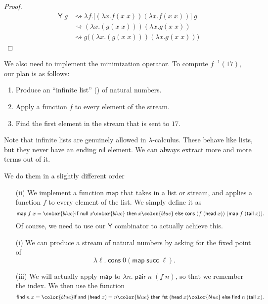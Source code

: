\documentclass[a4paper]{article}
\newcommand\head{\mathsf{head}}
\newcommand\tail{\mathsf{tail}}
\newcommand\pair{\mathsf{pair}}
\renewcommand\succ{\mathsf{succ}}
\newcommand\cif{{\color{blue} \mathsf{if}\;}}
\newcommand\cthen{{\color{blue}\;\mathsf{then}\;}}
\newcommand\celse{{\color{blue}\;\mathsf{else}\;}}
\newcommand\cons{\mathsf{cons}}
\newcommand\cfst{\mathsf{fst}}
\newcommand\csnd{\mathsf{snd}}
\newcommand\cnil{\mathsf{nil}}
\newcommand\cmap{\mathsf{map}}
\newcommand\cnull{\mathsf{null}}
\newcommand\Yc{\mathsf{Y}}
\newcommand\cfind{\mathsf{find}}
\begin{document}
\begin{proof}
  \begin{align*}
    \Yc\; g &\rightsquigarrow \lambda f. \Big[ (\lambda x. f(x\; x)) (\lambda x. f(x\; x))\Big]\; g\\
    &\rightsquigarrow (\lambda x. (g(x\; x))) (\lambda x . g(x\; x))\\
    &\rightsquigarrow g\Big((\lambda x. (g(x\; x))) (\lambda x . g(x\; x))\Big)
  \end{align*}
\end{proof}
We also need to implement the minimization operator. To compute $f^{-1}(17)$, our plan is as follows:
\begin{enumerate}
  \item Produce an ``infinite list'' () of natural numbers.
  \item Apply a function $f$ to every element of the stream.
  \item Find the first element in the stream that is sent to $17$.
\end{enumerate}
Note that infinite lists are genuinely allowed in $\lambda$-calculus. These behave like lists, but they never have an ending $\cnil$ element. We can always extract more and more terms out of it.

We do them in a slightly different order
\begin{enumerate}
  \item[(ii)] We implement a function $\cmap$ that takes in a list or stream, and applies a function $f$ to every element of the list. We simply define it as
    \[
      \cmap\; f\; x = \cif \cnull\; x \cthen x \celse \cons\; (f\; (\head\; x))\;(\cmap\;f\; (\tail\; x)).
    \]
    Of course, we need to use our $\Yc$ combinator to actually achieve this.
  \item[(i)] We can produce a stream of natural numbers by asking for the fixed point of
    \[
      \lambda \ell.\; \cons \; 0 (\cmap\;\succ\;\ell).
    \]
  \item [(iii)] We will actually apply $\cmap$ to $\lambda n.\; \pair\; n\; (f\; n)$, so that we remember the index. We then use the function
    \[
      \cfind\; n\; x = \cif \csnd\;(\head\;x) = n \cthen \cfst\;(\head\;x) \celse \cfind\; n\; (\tail\;x).
    \]
\end{enumerate}
\end{document}
